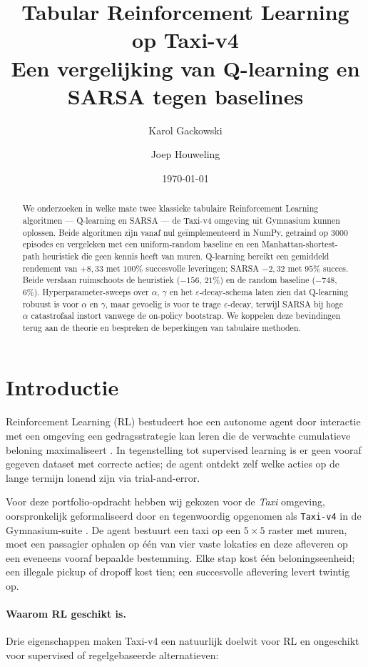 \documentclass[11pt,a4paper]{article}
\title{\textbf{Tabular Reinforcement Learning op Taxi-v4} \\
       \large Een vergelijking van Q-learning en SARSA tegen baselines}
\author{Karol Gackowski \and Joep Houweling}
\date{\today}
\begin{document}
\maketitle

\begin{abstract}
\noindent
We onderzoeken in welke mate twee klassieke tabulaire Reinforcement
Learning algoritmen --- Q-learning en SARSA --- de Taxi-v4 omgeving uit
Gymnasium kunnen oplossen. Beide algoritmen zijn vanaf nul ge\"implementeerd
in NumPy, getraind op 3000 episodes en vergeleken met een uniform-random
baseline en een Manhattan-shortest-path heuristiek die geen kennis heeft
van muren. Q-learning bereikt een gemiddeld rendement van $+8{,}33$ met
$100\%$ succesvolle leveringen; SARSA $-2{,}32$ met $95\%$ succes. Beide
verslaan ruimschoots de heuristiek ($-156$, $21\%$) en de random baseline
($-748$, $6\%$). Hyperparameter-sweeps over $\alpha$, $\gamma$ en het
$\varepsilon$-decay-schema laten zien dat Q-learning robuust is voor
$\alpha$ en $\gamma$, maar gevoelig is voor te trage $\varepsilon$-decay,
terwijl SARSA bij hoge $\alpha$ catastrofaal instort vanwege de
on-policy bootstrap. We koppelen deze bevindingen terug aan de theorie en
bespreken de beperkingen van tabulaire methoden.
\end{abstract}

\section{Introductie}

Reinforcement Learning (RL) bestudeert hoe een autonome agent door
interactie met een omgeving een gedragsstrategie kan leren die de
verwachte cumulatieve beloning maximaliseert
\cite{sutton_barto_2018}. In tegenstelling tot supervised learning is er
geen vooraf gegeven dataset met correcte acties; de agent ontdekt zelf
welke acties op de lange termijn lonend zijn via trial-and-error.

Voor deze portfolio-opdracht hebben wij gekozen voor de \emph{Taxi}
omgeving, oorspronkelijk geformaliseerd door
\citet{dietterich_2000} en tegenwoordig opgenomen als
\texttt{Taxi-v4} in de Gymnasium-suite \cite{towers_2024}. De agent
bestuurt een taxi op een $5 \times 5$ raster met muren, moet een
passagier ophalen op \'e\'en van vier vaste lokaties en deze afleveren op
een eveneens vooraf bepaalde bestemming. Elke stap kost \'e\'en
beloningseenheid; een illegale pickup of dropoff kost tien; een
succesvolle aflevering levert twintig op.

\paragraph{Waarom RL geschikt is.}
Drie eigenschappen maken Taxi-v4 een natuurlijk doelwit voor RL en
ongeschikt voor supervised of regelgebaseerde alternatieven:
\end{document}
